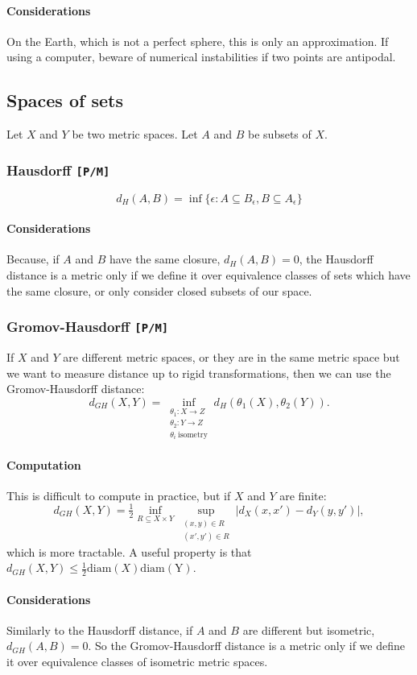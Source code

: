 \documentclass[12pt,a4paper]{article}
\newcommand{\1}[1]{\mathds{1}\left[#1\right]}
\begin{document}
\paragraph{Considerations} On the Earth, which is not a perfect sphere, this is only an approximation. If using a computer, beware of numerical instabilities if two points are antipodal.


\subsection{Spaces of sets}
Let $X$ and $Y$ be two metric spaces. Let $A$ and $B$ be subsets of $X$.
\subsubsection{Hausdorff \texttt{[P/M]}}
\[d_H(A,B) = \inf\{\epsilon:A\subseteq B_\epsilon, B\subseteq A_\epsilon\}\]
\paragraph{Considerations} Because, if $A$ and $B$ have the same closure, $d_H(A,B)=0$, the Hausdorff distance is a metric only if we define it over equivalence classes of sets which have the same closure, or only consider closed subsets of our space.
\subsubsection{Gromov-Hausdorff \texttt{[P/M]}}
If $X$ and $Y$ are different metric spaces, or they are in the same metric space but we want to measure distance up to rigid transformations, then we can use the Gromov-Hausdorff distance:
\[d_{GH}(X,Y) = \inf_{\substack{\theta_1:X\to Z\\\theta_2:Y\to Z\\\theta_i\ \mathrm{isometry}}}d_H(\theta_1(X),\theta_2(Y)).\]
\paragraph{Computation} This is difficult to compute in practice, but if $X$ and $Y$ are finite:
\[d_{GH}(X,Y)=\tfrac{1}{2}\inf_{R\subseteq X\times Y}\sup_{\substack{(x,y)\in R\\(x',y')\in R}}|d_X(x,x')-d_Y(y,y')|,\]
which is more tractable. A useful property is that $d_{GH}(X,Y)\leq \frac{1}{2}\mathrm{diam}(X)\mathrm{diam(Y)}$.
\paragraph{Considerations}
Similarly to the Hausdorff distance, if $A$ and $B$ are different but isometric, $d_{GH}(A,B)=0$. So the Gromov-Hausdorff distance is a metric only if we define it over equivalence classes of isometric metric spaces.
\end{document}
